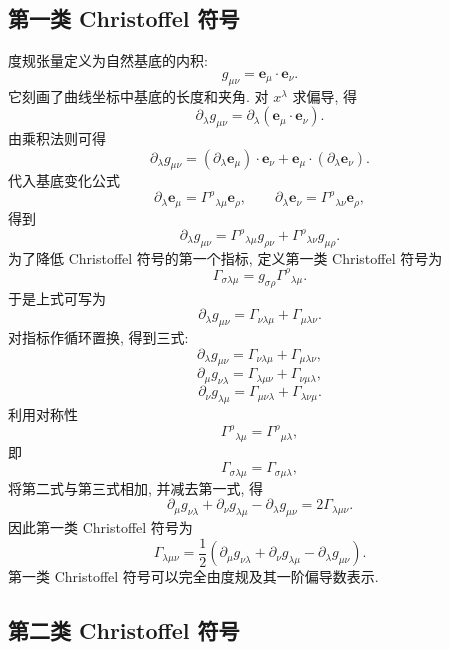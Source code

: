 \subsection{第一类 Christoffel 符号}

度规张量定义为自然基底的内积: 
\[
g_{\mu\nu}
=
\bm{e}_{\mu}\cdot\bm{e}_{\nu}.
\]
它刻画了曲线坐标中基底的长度和夹角. 对 $x^{\lambda}$ 求偏导, 得
\[
\partial_{\lambda}g_{\mu\nu}
=
\partial_{\lambda}
(\bm{e}_{\mu}\cdot\bm{e}_{\nu}).
\]
由乘积法则可得
\[
\partial_{\lambda}g_{\mu\nu}
=
(\partial_{\lambda}\bm{e}_{\mu})\cdot\bm{e}_{\nu}
+
\bm{e}_{\mu}\cdot
(\partial_{\lambda}\bm{e}_{\nu}).
\]
代入基底变化公式
\[
\partial_{\lambda}\bm{e}_{\mu}
=
\Gamma^{\rho}{}_{\lambda\mu}\bm{e}_{\rho},
\qquad
\partial_{\lambda}\bm{e}_{\nu}
=
\Gamma^{\rho}{}_{\lambda\nu}\bm{e}_{\rho},
\]
得到
\[
\partial_{\lambda}g_{\mu\nu}
=
\Gamma^{\rho}{}_{\lambda\mu}g_{\rho\nu}
+
\Gamma^{\rho}{}_{\lambda\nu}g_{\mu\rho}.
\]
为了降低 Christoffel 符号的第一个指标, 定义第一类 Christoffel 符号为
\begin{equation}
	\Gamma_{\sigma\lambda\mu}
	=
	g_{\sigma\rho}\Gamma^{\rho}{}_{\lambda\mu}.
	\label{eq:2.3}
\end{equation}
于是上式可写为
\[
\partial_{\lambda}g_{\mu\nu}
=
\Gamma_{\nu\lambda\mu}
+
\Gamma_{\mu\lambda\nu}.
\]
对指标作循环置换, 得到三式: 
\[
\partial_{\lambda}g_{\mu\nu}
=
\Gamma_{\nu\lambda\mu}
+
\Gamma_{\mu\lambda\nu},
\]
\[
\partial_{\mu}g_{\nu\lambda}
=
\Gamma_{\lambda\mu\nu}
+
\Gamma_{\nu\mu\lambda},
\]
\[
\partial_{\nu}g_{\lambda\mu}
=
\Gamma_{\mu\nu\lambda}
+
\Gamma_{\lambda\nu\mu}.
\]
利用对称性
\[
\Gamma^{\rho}{}_{\lambda\mu}
=
\Gamma^{\rho}{}_{\mu\lambda},
\]
即
\[
\Gamma_{\sigma\lambda\mu}
=
\Gamma_{\sigma\mu\lambda},
\]
将第二式与第三式相加, 并减去第一式, 得
\[
\partial_{\mu}g_{\nu\lambda}
+
\partial_{\nu}g_{\lambda\mu}
-
\partial_{\lambda}g_{\mu\nu}
=
2\Gamma_{\lambda\mu\nu}.
\]
因此第一类 Christoffel 符号为
\begin{equation}
	\Gamma_{\lambda\mu\nu}
	=
	\frac{1}{2}
	\left(
	\partial_{\mu}g_{\nu\lambda}
	+
	\partial_{\nu}g_{\lambda\mu}
	-
	\partial_{\lambda}g_{\mu\nu}
	\right).
	\label{eq:2.4}
\end{equation}
第一类 Christoffel 符号可以完全由度规及其一阶偏导数表示. 

\subsection{第二类 Christoffel 符号}

